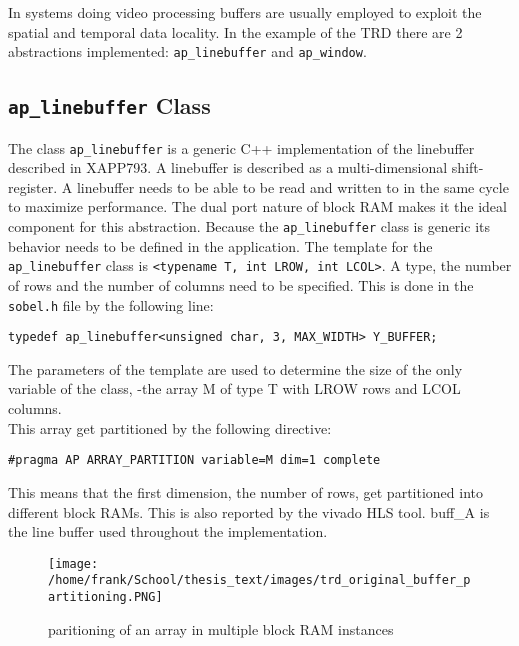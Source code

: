 In systems doing video processing buffers are usually employed to exploit the spatial and temporal data locality. In the example of the TRD there are 2 abstractions implemented: \texttt{ap\_linebuffer} and \texttt{ap\_window}.

\subsection{\texttt{ap\_linebuffer} Class}

The class \texttt{ap\_linebuffer} is a generic C++ implementation of the linebuffer described in XAPP793. A linebuffer is described as a multi-dimensional shift-register. A linebuffer needs to be able to be read and written to in the same cycle to maximize performance. The dual port nature of block RAM makes it the ideal component for this abstraction.
Because the \texttt{ap\_linebuffer} class is generic its behavior needs to be defined in the application. The template for the \texttt{ap\_linebuffer} class is \texttt{<typename T, int LROW, int LCOL>}. A type, the number of rows and the number of columns need to be specified. This is done in the \texttt{sobel.h} file by the following line:

\begin{verbatim}
typedef ap_linebuffer<unsigned char, 3, MAX_WIDTH> Y_BUFFER;
\end{verbatim}

The parameters of the template are used to determine the size of the only variable of the class, -the array M of type T with LROW rows and LCOL columns.\\
This array get partitioned by the following directive:

\begin{verbatim}
#pragma AP ARRAY_PARTITION variable=M dim=1 complete
\end{verbatim}

This means that the first dimension, the number of rows, get partitioned into different block RAMs. This is also reported by the vivado HLS tool. buff\_A is the line buffer used throughout the implementation.\\

\medskip

\begin{figure}[h]
\centering
\texttt{[image: /home/frank/School/thesis\_text/images/trd\_original\_buffer\_partitioning.PNG]} 
\caption{paritioning of an array in multiple block RAM instances}
\end{figure}


